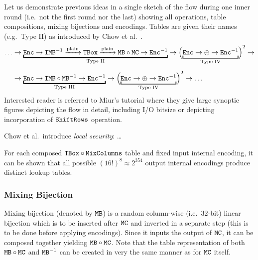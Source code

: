 	Let us demonstrate previous ideas in a single sketch of the flow during one inner round (i.e.\ not the first round nor the last) showing all operations, table compositions, mixing bijections and encodings. Tables are given their names (e.g.\ Type II) as introduced by Chow et al.\ \cite{chow2002aes}.
	\begin{align}
	\label{eq:wbaesflow} %
		\ldots&\rarr\underbracket{\Enc\rarr\IMB^{-1}\xrightarrow{\textnormal{plain}}\TBox\xrightarrow{\textnormal{plain}}\MB\circ\MC\rarr\Enc^{-1}}_{\textnormal{Type II}}\rarr\Bigl(\underbracket{\Enc\rarr\xor\rarr\Enc^{-1}}_{\textnormal{Type IV}}\Bigr)^2\rarr\nonumber\\[.5em]
		&\rarr\underbracket{\Enc\rarr\IMB\circ\MB^{-1}\rarr\Enc^{-1}}_{\textnormal{Type III}}\rarr\Bigl(\underbracket{\Enc\rarr\xor\rarr\Enc^{-1}}_{\textnormal{Type IV}}\Bigr)^2\rarr\ldots
	\end{align}
	Interested reader is referred to Miur's tutorial \cite{muir2013tutorial} where they give large synoptic figures depicting the flow in detail, including I/O bitsize or depicting incorporation of $\texttt{ShiftRows}$ operation.
	
	
	\begin{remark}
	\label{rem:localsec}
		Chow et al.\ introduce {\em local security}: \ldots
		
		For each composed $\texttt{TBox}\circ\texttt{MixColumns}$ table and fixed input internal encoding, it can be shown that all possible $(16!)^8 \approx 2^{354}$ output internal encodings produce distinct lookup tables.
	\end{remark}
	

\subsubsection{Mixing Bijection}
	
	Mixing bijection (denoted by $\texttt{MB}$) is a random column-wise (i.e.\ $32$-bit) linear bijection which is to be inserted after $\texttt{MC}$ and inverted in a separate step (this is to be done before applying encodings). Since it inputs the output of $\texttt{MC}$, it can be composed together yielding $\texttt{MB}\circ\texttt{MC}$. Note that the table representation of both $\texttt{MB}\circ\texttt{MC}$ and $\texttt{MB}^{-1}$ can be created in very the same manner as for $\texttt{MC}$ itself.
	
